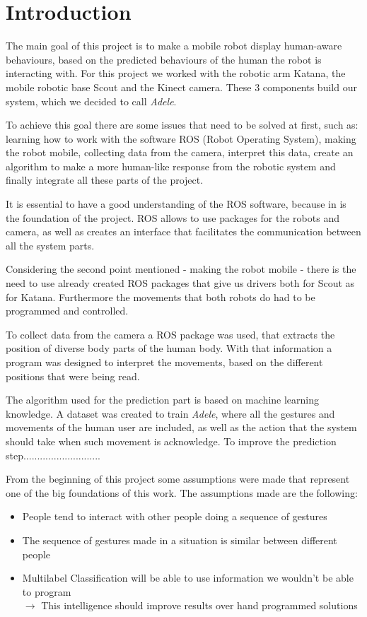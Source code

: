 
\section{Introduction}
The main goal of this project is to make a mobile robot display human-aware behaviours, based on the predicted behaviours of the human the robot is interacting with. For this project we worked with the robotic arm Katana, the mobile robotic base Scout and the Kinect camera. These 3 components build our system, which we decided to call \textit{Adele}.

To achieve this goal there are some issues that need to be solved at first, such as: learning how to work with the software ROS (Robot Operating System), making the robot mobile, collecting data from the camera, interpret this data, create an algorithm to make a more human-like response from the robotic system and finally integrate all these parts of the project.

It is essential to have a good understanding of the ROS software, because in is the foundation of the project. ROS allows to use packages for the robots and camera, as well as creates an interface that facilitates the communication between all the system parts.

Considering the second point mentioned - making the robot mobile - there is the need to use already created ROS packages that give us drivers both for Scout as for Katana. Furthermore the movements that both robots do had to be programmed and controlled.

To collect data from the camera a ROS package was used, that extracts the position of diverse body parts of the human body. With that information a program was designed to interpret the movements, based on the different positions that were being read.

The algorithm used for the prediction part is based on machine learning knowledge. A dataset was created to train \textit{Adele}, where all the gestures and movements of the human user are included, as well as the action that the system should take when such movement is acknowledge. To improve the prediction step............................

From the beginning of this project some assumptions were made that represent one of the big foundations of this work. The assumptions made are the following:
\begin{itemize}
\item People tend to interact with other people doing a sequence of gestures
\item The sequence of gestures made in a situation is similar between different people 
\item Multilabel Classification will be able to use information we wouldn't be able to program\\
\qquad $\rightarrow$ This intelligence should improve results over hand programmed solutions
\end{itemize}

